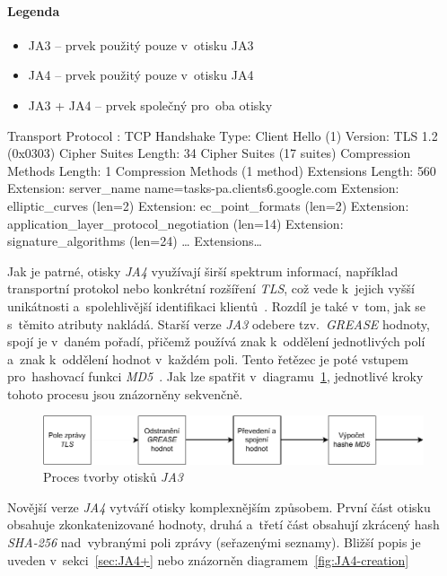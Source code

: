 \paragraph{Legenda}
\begin{itemize}
	\item \colorbox{ForestGreen!30}{JA3} – prvek použitý pouze v~otisku JA3
	\item \colorbox{DodgerBlue!30}{JA4} – prvek použitý pouze v~otisku JA4
	\item \colorbox{Plum!30}{JA3 + JA4} – prvek společný pro~oba otisky
\end{itemize}

\begin{TLSDisplay}
	Transport Protocol : \colorbox{DodgerBlue!30}{TCP}
	Handshake Type: Client Hello (1)
	Version: \colorbox{Plum!30}{TLS 1.2} (0x0303)
	Cipher Suites Length: \colorbox{DodgerBlue!30}{34}
	\colorbox{Plum!30}{Cipher Suites} \colorbox{DodgerBlue!30}{(17 suites)}
	Compression Methods Length: 1
	Compression Methods (1 method)
	Extensions Length: \colorbox{DodgerBlue!30}{560}
	Extension: \colorbox{DodgerBlue!30}{server_name name=tasks-pa.clients6.google.com}
	Extension: \colorbox{ForestGreen!30}{elliptic_curves} (len=2)
	Extension: \colorbox{ForestGreen!30}{ec_point_formats} (len=2)
	Extension: \colorbox{DodgerBlue!30}{application_layer_protocol_negotiation} (len=14)
	Extension: \colorbox{DodgerBlue!30}{signature_algorithms} (len=24)
	\dots
	\colorbox{Plum!30}{Extensions\dots}
\end{TLSDisplay}


Jak je patrné, otisky \textit{JA4} využívají širší spektrum informací, například transportní protokol nebo konkrétní rozšíření \textit{TLS}, což vede k~jejich vyšší unikátnosti a~spolehlivější identifikaci klientů~\cite{Althouse2023}.  Rozdíl je také v~tom, jak se s~těmito atributy nakládá. Starší verze \textit{JA3} odebere tzv.~\textit{GREASE} hodnoty, spojí je v~daném pořadí, přičemž používá znak \uv{,} k~oddělení jednotlivých polí a~znak \uv{-} k~oddělení hodnot v~každém poli. Tento řetězec je poté vstupem pro~hashovací funkci \textit{MD5}~\cite{Althouse2022JA3}. Jak lze spatřit v~diagramu~\ref{fig:JA3-creation}, jednotlivé kroky tohoto procesu jsou znázorněny sekvenčně.

\begin{figure}[H]
	\centering
	\includegraphics[width=\textwidth]{obrazky-figures/ja3-creation.drawio-crop.pdf}
	\caption{Proces tvorby otisků \textit{JA3}}
	\label{fig:JA3-creation}
\end{figure}
Novější verze \textit{JA4} vytváří otisky komplexnějším způsobem. První část otisku obsahuje zkonkatenizované hodnoty, druhá a~třetí část obsahují zkrácený hash \textit{SHA-256} nad~vybranými poli zprávy (seřazenými seznamy). Bližší popis je uveden v~sekci~\ref{sec:JA4+} nebo znázorněn diagramem~\ref{fig:JA4-creation}

